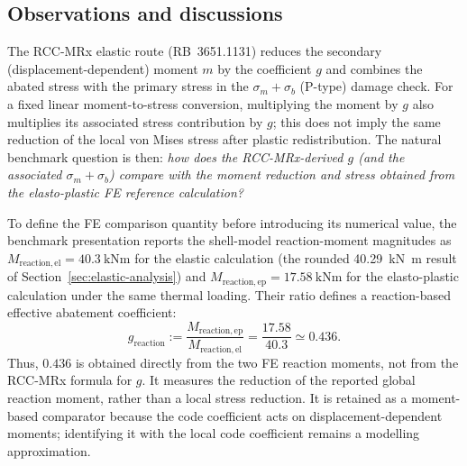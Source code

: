 \documentclass[10pt,a4paper]{article}
\begin{document}
\clearpage
\subsection{Observations and discussions}
\label{sec:discussion}

The RCC-MRx elastic route (RB~3651.1131) reduces the secondary (displacement-dependent) moment $m$ by the coefficient $g$ and combines the abated stress with the primary stress in the $\sigma_m+\sigma_b$ (P-type) damage check. For a fixed linear moment-to-stress conversion, multiplying the moment by $g$ also multiplies its associated stress contribution by $g$; this does not imply the same reduction of the local von Mises stress after plastic redistribution. The natural benchmark question is then: \emph{how does the RCC-MRx-derived $g$ (and the associated $\sigma_m+\sigma_b$) compare with the moment reduction and stress obtained from the elasto-plastic FE reference calculation?}

To define the FE comparison quantity before introducing its numerical value, the benchmark presentation reports the shell-model reaction-moment magnitudes as $M_{\mathrm{reaction,el}}=\SI{40.3}{\kilo\newton\metre}$ for the elastic calculation (the rounded \SI{40.29}{\kilo\newton\metre} result of Section~\ref{sec:elastic-analysis}) and $M_{\mathrm{reaction,ep}}=\SI{17.58}{\kilo\newton\metre}$ for the elasto-plastic calculation under the same thermal loading. Their ratio defines a reaction-based effective abatement coefficient:
\begin{equation}
g_{\mathrm{reaction}}
:=\frac{M_{\mathrm{reaction,ep}}}{M_{\mathrm{reaction,el}}}
=\frac{17.58}{40.3}
\simeq 0.436.
\label{eq:g-reaction-fe}
\end{equation}
Thus, $0.436$ is obtained directly from the two FE reaction moments, not from the RCC-MRx formula for $g$. It measures the reduction of the reported global reaction moment, rather than a local stress reduction. It is retained as a moment-based comparator because the code coefficient acts on displacement-dependent moments; identifying it with the local code coefficient remains a modelling approximation.
\end{document}
